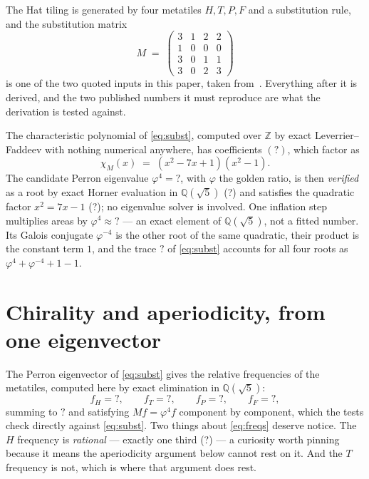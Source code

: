 \documentclass[11pt,a4paper]{article}
\newcommand{\MTCharPoly}{?}\newcommand{\MTPhiFour}{?}
\newcommand{\MTPhiFourFloat}{?}\newcommand{\MTPhiFourIsRoot}{?}
\newcommand{\MTPhiFourQuadratic}{?}\newcommand{\MTSubTrace}{?}
\newcommand{\MTFreqH}{?}\newcommand{\MTFreqT}{?}
\newcommand{\MTFreqP}{?}\newcommand{\MTFreqF}{?}
\newcommand{\MTFreqHRational}{?}\newcommand{\MTFreqSum}{?}
\newcommand{\QQ}{\mathbb{Q}}
\newcommand{\ZZ}{\mathbb{Z}}
\theoremstyle{definition}
\begin{document}
The Hat tiling is generated by four metatiles $H, T, P, F$ and a
substitution rule, and the substitution matrix
%
\begin{equation}
M \;=\;
\begin{pmatrix}
3 & 1 & 2 & 2\\
1 & 0 & 0 & 0\\
3 & 0 & 1 & 1\\
3 & 0 & 2 & 3
\end{pmatrix}
\label{eq:subst}
\end{equation}
%
is one of the two quoted inputs in this paper, taken
from~\cite{Smith2023a}. Everything after it is derived, and the two
published numbers it must reproduce are what the derivation is tested
against.

The characteristic polynomial of \cref{eq:subst}, computed over $\ZZ$ by
exact Leverrier--Faddeev with nothing numerical anywhere, has coefficients
$(\MTCharPoly)$, which factor as
%
\begin{equation}
\chi_M(x) \;=\; (x^2 - 7x + 1)(x^2 - 1) .
\label{eq:charpoly}
\end{equation}
%
The candidate Perron eigenvalue $\varphi^4 = \MTPhiFour$, with $\varphi$ the
golden ratio, is then \emph{verified} as a root by exact Horner evaluation
in $\QQ(\sqrt5)$ (\MTPhiFourIsRoot) and satisfies the quadratic factor
$x^2 = 7x - 1$ (\MTPhiFourQuadratic); no eigenvalue solver is involved. One
inflation step multiplies areas by
$\varphi^4 \approx \MTPhiFourFloat$ --- an exact element of $\QQ(\sqrt5)$,
not a fitted number. Its Galois conjugate $\varphi^{-4}$ is the other root
of the same quadratic, their product is the constant term $1$, and the trace
$\MTSubTrace$ of \cref{eq:subst} accounts for all four roots as
$\varphi^4 + \varphi^{-4} + 1 - 1$.


\section{Chirality and aperiodicity, from one eigenvector}
\label{sec:chirality}

The Perron eigenvector of \cref{eq:subst} gives the relative frequencies of
the metatiles, computed here by exact elimination in $\QQ(\sqrt5)$:
%
\begin{equation}
f_H = \MTFreqH, \qquad
f_T = \MTFreqT, \qquad
f_P = \MTFreqP, \qquad
f_F = \MTFreqF ,
\label{eq:freqs}
\end{equation}
%
summing to $\MTFreqSum$ and satisfying $M f = \varphi^4 f$ component by
component, which the tests check directly against \cref{eq:subst}. Two
things about \cref{eq:freqs} deserve notice. The $H$ frequency is
\emph{rational} --- exactly one third (\MTFreqHRational) --- a curiosity
worth pinning because it means the aperiodicity argument below cannot rest
on it. And the $T$ frequency is not, which is where that argument does
rest.
\end{document}

